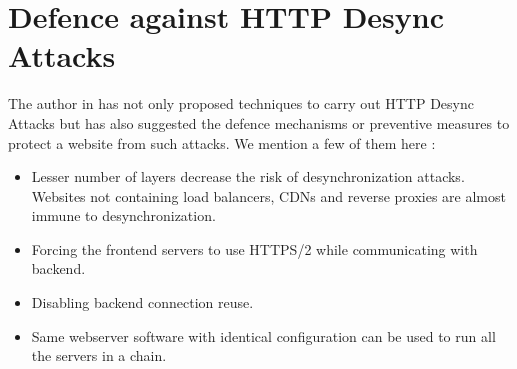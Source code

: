 \chapter{Defence against HTTP Desync Attacks}
The author in \cite{b6} has not only proposed techniques to carry out HTTP Desync Attacks but has also suggested the defence mechanisms or preventive measures to protect a website from such attacks. We mention a few of them here :
\begin{itemize}
	\item Lesser number of layers decrease the risk of desynchronization attacks. Websites not containing load balancers, CDNs and reverse proxies are almost immune to desynchronization. 
	\item Forcing the frontend servers to use HTTPS/2 \cite{b15} while communicating with backend. 
	\item Disabling backend connection reuse.
	\item Same webserver software with identical configuration can be used to run all the servers in a chain. 
\end{itemize}